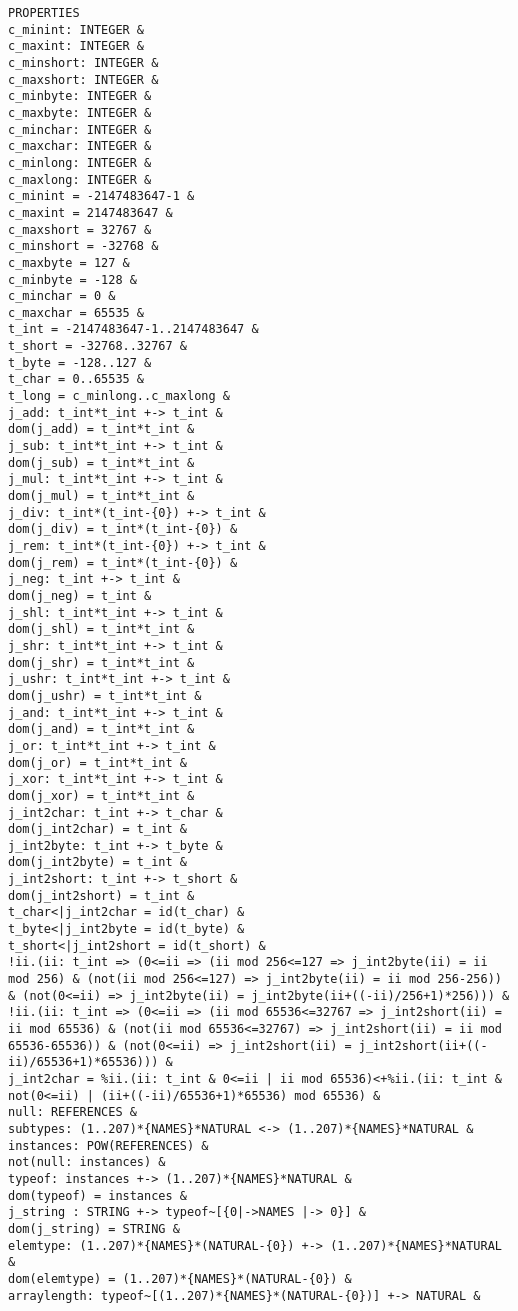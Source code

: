\begin{verbatim}
PROPERTIES
c_minint: INTEGER & 
c_maxint: INTEGER & 
c_minshort: INTEGER & 
c_maxshort: INTEGER & 
c_minbyte: INTEGER & 
c_maxbyte: INTEGER & 
c_minchar: INTEGER & 
c_maxchar: INTEGER & 
c_minlong: INTEGER & 
c_maxlong: INTEGER & 
c_minint = -2147483647-1 & 
c_maxint = 2147483647 & 
c_maxshort = 32767 & 
c_minshort = -32768 & 
c_maxbyte = 127 & 
c_minbyte = -128 & 
c_minchar = 0 & 
c_maxchar = 65535 & 
t_int = -2147483647-1..2147483647 & 
t_short = -32768..32767 & 
t_byte = -128..127 & 
t_char = 0..65535 & 
t_long = c_minlong..c_maxlong & 
j_add: t_int*t_int +-> t_int & 
dom(j_add) = t_int*t_int & 
j_sub: t_int*t_int +-> t_int & 
dom(j_sub) = t_int*t_int & 
j_mul: t_int*t_int +-> t_int & 
dom(j_mul) = t_int*t_int & 
j_div: t_int*(t_int-{0}) +-> t_int & 
dom(j_div) = t_int*(t_int-{0}) & 
j_rem: t_int*(t_int-{0}) +-> t_int & 
dom(j_rem) = t_int*(t_int-{0}) & 
j_neg: t_int +-> t_int & 
dom(j_neg) = t_int & 
j_shl: t_int*t_int +-> t_int & 
dom(j_shl) = t_int*t_int & 
j_shr: t_int*t_int +-> t_int & 
dom(j_shr) = t_int*t_int & 
j_ushr: t_int*t_int +-> t_int & 
dom(j_ushr) = t_int*t_int & 
j_and: t_int*t_int +-> t_int & 
dom(j_and) = t_int*t_int & 
j_or: t_int*t_int +-> t_int & 
dom(j_or) = t_int*t_int & 
j_xor: t_int*t_int +-> t_int & 
dom(j_xor) = t_int*t_int & 
j_int2char: t_int +-> t_char & 
dom(j_int2char) = t_int & 
j_int2byte: t_int +-> t_byte & 
dom(j_int2byte) = t_int & 
j_int2short: t_int +-> t_short & 
dom(j_int2short) = t_int & 
t_char<|j_int2char = id(t_char) & 
t_byte<|j_int2byte = id(t_byte) & 
t_short<|j_int2short = id(t_short) & 
!ii.(ii: t_int => (0<=ii => (ii mod 256<=127 => j_int2byte(ii) = ii mod 256) & (not(ii mod 256<=127) => j_int2byte(ii) = ii mod 256-256)) & (not(0<=ii) => j_int2byte(ii) = j_int2byte(ii+((-ii)/256+1)*256))) & 
!ii.(ii: t_int => (0<=ii => (ii mod 65536<=32767 => j_int2short(ii) = ii mod 65536) & (not(ii mod 65536<=32767) => j_int2short(ii) = ii mod 65536-65536)) & (not(0<=ii) => j_int2short(ii) = j_int2short(ii+((-ii)/65536+1)*65536))) & 
j_int2char = %ii.(ii: t_int & 0<=ii | ii mod 65536)<+%ii.(ii: t_int & not(0<=ii) | (ii+((-ii)/65536+1)*65536) mod 65536) & 
null: REFERENCES & 
subtypes: (1..207)*{NAMES}*NATURAL <-> (1..207)*{NAMES}*NATURAL & 
instances: POW(REFERENCES) & 
not(null: instances) & 
typeof: instances +-> (1..207)*{NAMES}*NATURAL & 
dom(typeof) = instances & 
j_string : STRING +-> typeof~[{0|->NAMES |-> 0}] &
dom(j_string) = STRING &
elemtype: (1..207)*{NAMES}*(NATURAL-{0}) +-> (1..207)*{NAMES}*NATURAL & 
dom(elemtype) = (1..207)*{NAMES}*(NATURAL-{0}) & 
arraylength: typeof~[(1..207)*{NAMES}*(NATURAL-{0})] +-> NATURAL & 

\end{verbatim}
